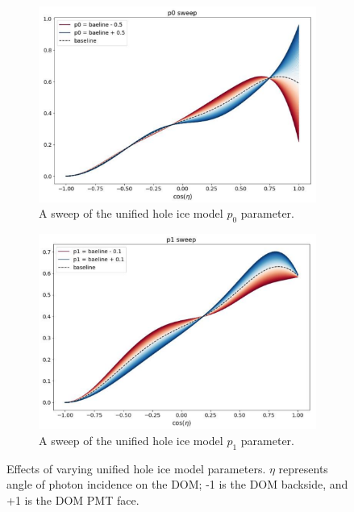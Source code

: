 \documentclass[main.tex]{subfiles}
\begin{document}
\begin{figure}
    \centering
    \begin{subfigure}{.45\textwidth}
        \centering
        \includegraphics[width=0.95\linewidth]{./figures/holeice_p0_sweep.png}
        \caption{A sweep of the unified hole ice model $p_0$ parameter.}
    \end{subfigure}%
    \begin{subfigure}{.45\textwidth}
        \centering
        \includegraphics[width=0.95\linewidth]{./figures/holeice_p1_sweep.png}
        \caption{A sweep of the unified hole ice model $p_1$ parameter.}
    \end{subfigure}
    \caption{Effects of varying unified hole ice model parameters. $\eta$ represents angle of photon incidence on the DOM; -1 is the DOM backside, and +1 is the DOM PMT face.}\label{fig:holeiceog}
\end{figure}
\end{document}
